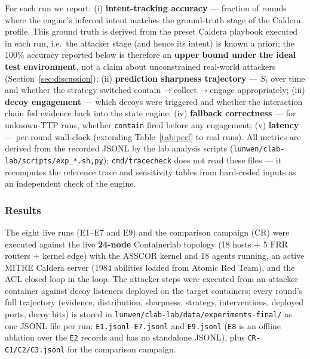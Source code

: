 \documentclass[preprints,article,accept,oneauthor]{Definitions/mdpi}
\newcommand{\act}[1]{\texttt{#1}}
\begin{document}
For each run we report: (i) \textbf{intent-tracking accuracy} --- fraction
of rounds where the engine's inferred intent matches the ground-truth stage
of the Caldera profile. This ground truth is derived from the preset Caldera
playbook executed in each run, i.e.\ the attacker stage (and hence its
intent) is known a priori; the 100\% accuracy reported below is therefore an
\textbf{upper bound under the ideal test environment}, not a claim about
unconstrained real-world attackers (Section~\ref{sec:discussion});
(ii) \textbf{prediction sharpness trajectory} ---
$S_t$ over time and whether the strategy switched contain$\to$collect$\to$engage
appropriately; (iii) \textbf{decoy engagement} --- which decoys were
triggered and whether the interaction chain fed evidence back into the
state engine; (iv) \textbf{fallback correctness} --- for unknown-TTP runs,
whether \act{contain} fired before any engagement; (v) \textbf{latency} ---
per-round wall-clock (extending Table~\ref{tab:perf} to real runs). All
metrics are derived from the recorded JSONL by the lab analysis scripts
(\texttt{lunwen/clab-lab/scripts/exp\_*.{sh,py}}); \texttt{cmd/tracecheck}
does not read these files --- it recomputes the reference trace and
sensitivity tables from hard-coded inputs as an independent check of the
engine.

\subsubsection{Results}

The eight live runs (E1--E7 and E9) and the comparison campaign (CR) were
executed against the live \textbf{24-node} Containerlab topology (18 hosts + 5 FRR
routers + kernel edge) with the ASSCOR kernel and 18 agents running, an
active MITRE Caldera server (1984 abilities loaded from Atomic Red Team),
and the ACL closed loop in the loop. The attacker steps were executed from
an attacker container against decoy listeners deployed on the target
containers; every round's full trajectory (evidence, distribution,
sharpness, strategy, interventions, deployed ports, decoy hits) is stored in
\texttt{lunwen/clab-lab/data/experiments-final/} as one JSONL file per run:
\texttt{E1.jsonl}--\texttt{E7.jsonl} and \texttt{E9.jsonl} (\texttt{E8} is an
offline ablation over the \texttt{E2} records and has no standalone JSONL),
plus \texttt{CR-C1/C2/C3.jsonl} for the comparison campaign.
\end{document}
